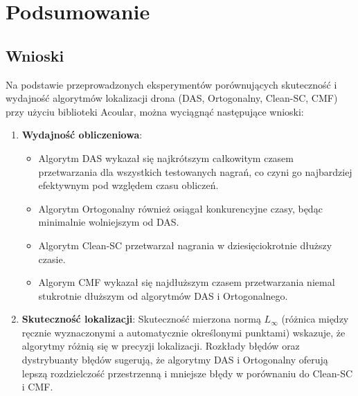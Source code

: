 \documentclass[12pt]{article}
\begin{document}
\newpage

\section{Podsumowanie}
\subsection{Wnioski}
Na podstawie przeprowadzonych eksperymentów porównujących skuteczność i wydajność algorytmów lokalizacji drona (DAS, Ortogonalny, Clean-SC, CMF) przy użyciu biblioteki Acoular, można wyciągnąć następujące wnioski:

\begin{enumerate}
    \item \textbf{Wydajność obliczeniowa}: 
    \begin{itemize}
        \item Algorytm DAS wykazał się najkrótszym całkowitym czasem przetwarzania dla wszystkich testowanych nagrań, co czyni go najbardziej efektywnym pod względem czasu obliczeń.
        \item Algorytm Ortogonalny również osiągał konkurencyjne czasy, będąc minimalnie wolniejszym od DAS.
        \item Algorytm Clean-SC przetwarzał nagrania w dziesięciokrotnie dłuższy czasie.
        \item Algorym CMF wykazał się najdłuższym czasem przetwarzania niemal stukrotnie dłuższym od algorytmów DAS i Ortogonalnego.
    \end{itemize}
    
    \item \textbf{Skuteczność lokalizacji}: 
        Skuteczność mierzona normą  $L_{\infty}$ (różnica między ręcznie wyznaczonymi a automatycznie określonymi punktami) wskazuje, że algorytmy różnią się w precyzji lokalizacji. Rozkłady błędów oraz dystrybuanty błędów sugerują, że algorytmy DAS i Ortogonalny oferują lepszą rozdzielczość przestrzenną i mniejsze błędy w porównaniu do Clean-SC i CMF.
\end{enumerate}
\end{document}
